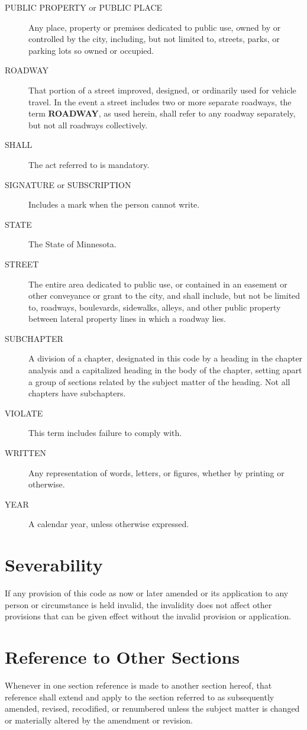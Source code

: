 \begin{description}
\item[PUBLIC PROPERTY or PUBLIC PLACE] Any place, property or premises dedicated to public use, owned by or controlled by the city, including, but not limited to, streets, parks, or parking lots so owned or occupied.
\item[ROADWAY] That portion of a street improved, designed, or ordinarily used for vehicle travel.  In the event a street includes two or more separate roadways, the term \textbf{ROADWAY}, as used herein, shall refer to any roadway separately, but not all roadways collectively.
\item[SHALL] The act referred to is mandatory.
\item[SIGNATURE or SUBSCRIPTION] Includes a mark when the person cannot write.
\item[STATE] The State of Minnesota.
\item[STREET] The entire area dedicated to public use, or contained in an easement or other conveyance or grant to the city, and shall include, but not be limited to, roadways, boulevards, sidewalks, alleys, and other public property between lateral property lines in which a roadway lies.
\item[SUBCHAPTER] A division of a chapter, designated in this code by a heading in the chapter analysis and a capitalized heading in the body of the chapter, setting apart a group of sections related by the subject matter of the heading.  Not all chapters have subchapters.
\item[VIOLATE] This term includes failure to comply with.
\item[WRITTEN] Any representation of words, letters, or figures, whether by printing or otherwise.
\item[YEAR] A calendar year, unless otherwise expressed.
\end{description}



\section{Severability}
If any provision of this code as now or later amended or its application to any person or circumstance is held invalid, the invalidity does not affect other provisions that can be given effect without the invalid provision or application.



\section{Reference to Other Sections}
Whenever in one section reference is made to another section hereof, that reference shall extend and apply to the section referred to as subsequently amended, revised, recodified, or renumbered unless the subject matter is changed or materially altered by the amendment or revision.



